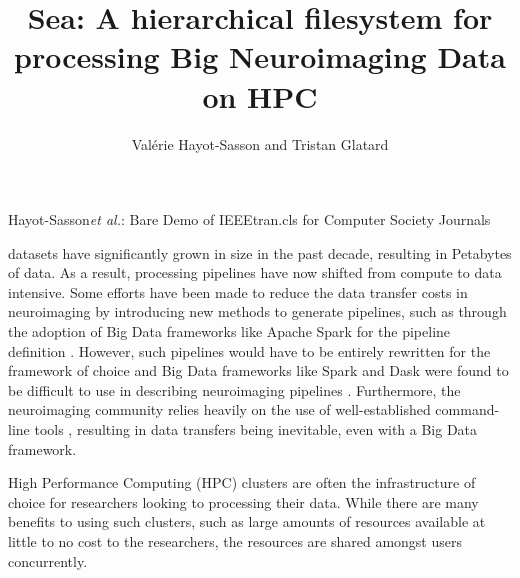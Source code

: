 \documentclass[10pt,journal,compsoc]{IEEEtran}
\begin{document}
\title{Sea: A hierarchical filesystem for processing Big Neuroimaging Data on HPC}

\author{Val\'erie Hayot-Sasson and Tristan Glatard}

%
{Hayot-Sasson\MakeLowercase{\textit{et al.}}: Bare Demo of IEEEtran.cls for Computer Society Journals}
\IEEEtitleabstractindextext{%
\begin{abstract}
\end{abstract}
}


\maketitle


\IEEEdisplaynontitleabstractindextext
\IEEEpeerreviewmaketitle



 datasets have significantly grown in size in the past decade,
resulting in Petabytes of data. As a result, processing pipelines have now shifted from compute to 
data intensive. Some efforts have been made to reduce the data transfer costs in neuroimaging by
introducing new methods to generate pipelines, such as through the adoption of Big Data frameworks
like Apache Spark \cite{Spark} for the pipeline definition \cite{thunder} \cite{other papers}. 
However, such pipelines would have to be entirely rewritten for the framework of choice and Big Data
frameworks like Spark and Dask were found to be difficult to use in describing neuroimaging pipelines \cite{mehta}.
Furthermore, the neuroimaging community relies heavily on the use of well-established command-line tools \cite{fsl, afni, freesurfer}, resulting in
data transfers being inevitable, even with a Big Data framework. 

High Performance Computing (HPC) clusters are often the infrastructure of choice for researchers looking to processing their data.
While there are many benefits to using such clusters, such as large amounts of resources available at little to no cost to
the researchers, the resources are shared amongst users concurrently. 
\end{document}
